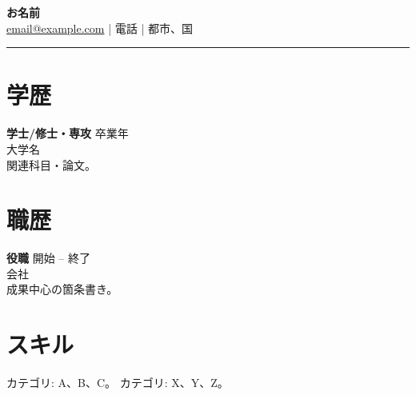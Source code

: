 \documentclass[11pt,a4paper]{article}
\begin{document}
\begin{center}
{\LARGE \textbf{お名前}}\\[0.3em]
\href{mailto:email@example.com}{email@example.com} \quad | \quad 電話 \quad | \quad 都市、国
\end{center}
\begin{flushright}\rule{2cm}{2.5cm}\end{flushright}
\vspace{0.6em}
\section*{学歴}
\textbf{学士/修士・専攻} \hfill 卒業年 \\
大学名 \\
関連科目・論文。

\section*{職歴}
\textbf{役職} \hfill 開始 -- 終了 \\
会社 \\
成果中心の箇条書き。

\section*{スキル}
カテゴリ: A、B、C。 \quad カテゴリ: X、Y、Z。
\end{document}
